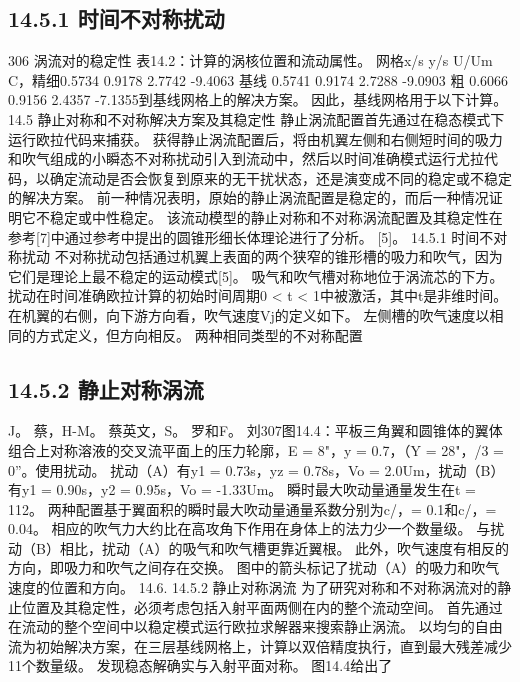\documentclass[UTF8,11pt,a4paper,openany,fontset=fandol]{ctexbook}
\begin{document}
\subsection{14.5.1 时间不对称扰动}
306 涡流对的稳定性 表14.2：计算的涡核位置和流动属性。 网格x/s y/s U/Um C，精细0.5734 0.9178 2.7742 -9.4063 基线 0.5741 0.9174 2.7288 -9.0903 粗 0.6066 0.9156 2.4357 -7.1355到基线网格上的解决方案。 因此，基线网格用于以下计算。 14.5 静止对称和不对称解决方案及其稳定性 静止涡流配置首先通过在稳态模式下运行欧拉代码来捕获。 获得静止涡流配置后，将由机翼左侧和右侧短时间的吸力和吹气组成的小瞬态不对称扰动引入到流动中，然后以时间准确模式运行尤拉代码，以确定流动是否会恢复到原来的无干扰状态，还是演变成不同的稳定或不稳定的解决方案。 前一种情况表明，原始的静止涡流配置是稳定的，而后一种情况证明它不稳定或中性稳定。 该流动模型的静止对称和不对称涡流配置及其稳定性在参考[7]中通过参考中提出的圆锥形细长体理论进行了分析。 [5]。 14.5.1 时间不对称扰动 不对称扰动包括通过机翼上表面的两个狭窄的锥形槽的吸力和吹气，因为它们是理论上最不稳定的运动模式[5]。 吸气和吹气槽对称地位于涡流芯的下方。 扰动在时间准确欧拉计算的初始时间周期0 < t < 1中被激活，其中t是非维时间。 在机翼的右侧，向下游方向看，吹气速度Vj的定义如下。 左侧槽的吹气速度以相同的方式定义，但方向相反。 两种相同类型的不对称配置

\subsection{14.5.2 静止对称涡流}
J。 蔡，H-M。 蔡英文，S。 罗和F。 刘307图14.4：平板三角翼和圆锥体的翼体组合上对称溶液的交叉流平面上的压力轮廓，E = 8"，y = 0.7，（Y = 28"，/3 = 0”。使用扰动。 扰动（A）有y1 = 0.73s，yz = 0.78s，Vo = 2.0Um，扰动（B）有y1 = 0.90s，y2 = 0.95s，Vo = -1.33Um。 瞬时最大吹动量通量发生在t = 112。 两种配置基于翼面积的瞬时最大吹动量通量系数分别为c/，= 0.1和c/，= 0.04。 相应的吹气力大约比在高攻角下作用在身体上的法力少一个数量级。 与扰动（B）相比，扰动（A）的吸气和吹气槽更靠近翼根。 此外，吹气速度有相反的方向，即吸力和吹气之间存在交换。 图中的箭头标记了扰动（A）的吸力和吹气速度的位置和方向。 14.6. 14.5.2 静止对称涡流 为了研究对称和不对称涡流对的静止位置及其稳定性，必须考虑包括入射平面两侧在内的整个流动空间。 首先通过在流动的整个空间中以稳定模式运行欧拉求解器来搜索静止涡流。 以均匀的自由流为初始解决方案，在三层基线网格上，计算以双倍精度执行，直到最大残差减少11个数量级。 发现稳态解确实与入射平面对称。 图14.4给出了
\end{document}
